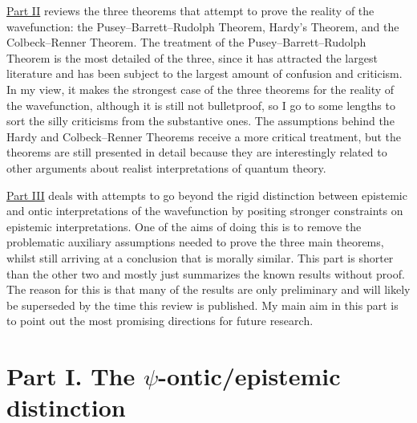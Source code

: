 \documentclass[DIV=calc,fontsize=12pt]{scrartcl} %
\theoremstyle{definition}
\theoremstyle{plain}
\begin{document}
\hyperref[SPON]{Part II} reviews the three theorems that attempt to prove the
reality of the wavefunction: the Pusey--Barrett--Rudolph Theorem, Hardy's Theorem, and the
Colbeck--Renner Theorem.  The treatment of the Pusey--Barrett--Rudolph Theorem is the most
detailed of the three, since it has attracted the largest literature
and has been subject to the largest amount of confusion and criticism.
In my view, it makes the strongest case of the three theorems for the
reality of the wavefunction, although it is still not bulletproof, so
I go to some lengths to sort the silly criticisms from the substantive
ones.  The assumptions behind the Hardy and Colbeck--Renner Theorems
receive a more critical treatment, but the theorems are still
presented in detail because they are interestingly related to other
arguments about realist interpretations of quantum theory.

\hyperref[Beyond]{Part III} deals with attempts to go beyond the rigid
distinction between epistemic and ontic interpretations of the
wavefunction by positing stronger constraints on epistemic
interpretations.  One of the aims of doing this is to remove the
problematic auxiliary assumptions needed to prove the three main
theorems, whilst still arriving at a conclusion that is morally
similar.  This part is shorter than the other two and mostly just
summarizes the known results without proof.  The reason for this is
that many of the results are only preliminary and will likely be
superseded by the time this review is published.  My main aim in this
part is to point out the most promising directions for future
research.

\section*{Part I. The $\psi$-ontic/epistemic distinction\label{OED}}
\end{document}
